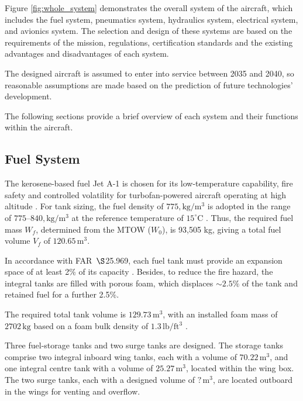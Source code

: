 Figure \ref{fig:whole_system} demonstrates the overall system of the aircraft, which includes the fuel system, pneumatics system, hydraulics system, electrical system, and avionics system. The selection and design of these systems are based on the requirements of the mission, regulations, certification standards and the existing advantages and disadvantages of each system. 

The designed aircraft is assumed to enter into service between 2035 and 2040, so reasonable assumptions are made based on the prediction of future technologies' development. 

The following sections provide a brief overview of each system and their functions within the aircraft.

\subsection{Fuel System}
The kerosene-based fuel Jet A-1 is chosen for its low-temperature capability, fire safety and controlled volatility for turbofan-powered aircraft operating at high altitude \cite{JetA1}. For tank sizing, the fuel density of $775,\mathrm{kg/m^3}$ is adopted in the range of $775$--$840,\mathrm{kg/m^3}$ at the reference temperature of $15^\circ\mathrm{C}$ \cite{JetA1}. Thus, the required fuel mass $W_f$, determined from the MTOW ($W_0$), is 93,505 kg, giving a total fuel volume $V_f$ of $120.65\,\text{m}^3$.

In accordance with FAR~$\S$25.969, each fuel tank must provide an expansion space of at least 2\% of its capacity \cite{FAR}. Besides, to reduce the fire hazard, the integral tanks are filled with porous foam, which displaces $\sim 2.5\%$ of the tank and retained fuel for a further 2.5\%.

The required total tank volume is \(129.73\,\mathrm{m^3}\), with an installed foam mass of \(2702\,\mathrm{kg}\) based on a foam bulk density of \(1.3\,\mathrm{lb/ft^3}\) \cite{Raymer Book}.

Three fuel-storage tanks and two surge tanks are designed. The storage tanks comprise two integral inboard wing tanks, each with a volume of $70.22\,\mathrm{m}^3$, and one integral centre tank with a volume of $25.27\,\mathrm{m}^3$, located within the wing box. The two surge tanks, each with a designed volume of $?\,\mathrm{m}^3$, are located outboard in the wings for venting and overflow.

